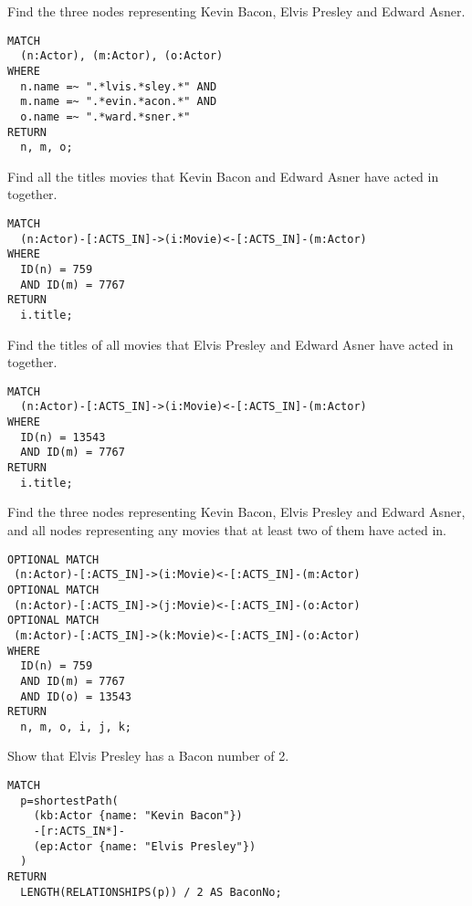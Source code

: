 \begin{questions}
\question
Find the three nodes representing Kevin Bacon, Elvis Presley and Edward Asner.
\begin{solution}
\begin{verbatim}
MATCH
  (n:Actor), (m:Actor), (o:Actor)
WHERE
  n.name =~ ".*lvis.*sley.*" AND 
  m.name =~ ".*evin.*acon.*" AND 		
  o.name =~ ".*ward.*sner.*"
RETURN
  n, m, o;
\end{verbatim}
\end{solution}

\question
Find all the titles movies that Kevin Bacon and Edward Asner have acted in together.
\begin{solution}
  \begin{verbatim}
MATCH
  (n:Actor)-[:ACTS_IN]->(i:Movie)<-[:ACTS_IN]-(m:Actor)
WHERE
  ID(n) = 759
  AND ID(m) = 7767
RETURN
  i.title;
  \end{verbatim}
\end{solution}

\question
Find the titles of all movies that Elvis Presley and Edward Asner have acted in together.
\begin{solution}
  \begin{verbatim}
MATCH
  (n:Actor)-[:ACTS_IN]->(i:Movie)<-[:ACTS_IN]-(m:Actor)
WHERE
  ID(n) = 13543
  AND ID(m) = 7767
RETURN
  i.title;
  \end{verbatim}
\end{solution}

\question
Find the three nodes representing Kevin Bacon, Elvis Presley and Edward Asner, and all nodes representing any movies that at least two of them have acted in.
\begin{solution}
  \begin{verbatim}
OPTIONAL MATCH
 (n:Actor)-[:ACTS_IN]->(i:Movie)<-[:ACTS_IN]-(m:Actor)
OPTIONAL MATCH
 (n:Actor)-[:ACTS_IN]->(j:Movie)<-[:ACTS_IN]-(o:Actor)
OPTIONAL MATCH
 (m:Actor)-[:ACTS_IN]->(k:Movie)<-[:ACTS_IN]-(o:Actor)
WHERE
  ID(n) = 759
  AND ID(m) = 7767
  AND ID(o) = 13543
RETURN
  n, m, o, i, j, k;
  \end{verbatim}
\end{solution}

\question
Show that Elvis Presley has a Bacon number of 2.
\begin{solution}
  \begin{verbatim}
MATCH
  p=shortestPath(
    (kb:Actor {name: "Kevin Bacon"})
    -[r:ACTS_IN*]-
    (ep:Actor {name: "Elvis Presley"})
  )
RETURN
  LENGTH(RELATIONSHIPS(p)) / 2 AS BaconNo;
  \end{verbatim}
\end{solution}


\end{questions}
